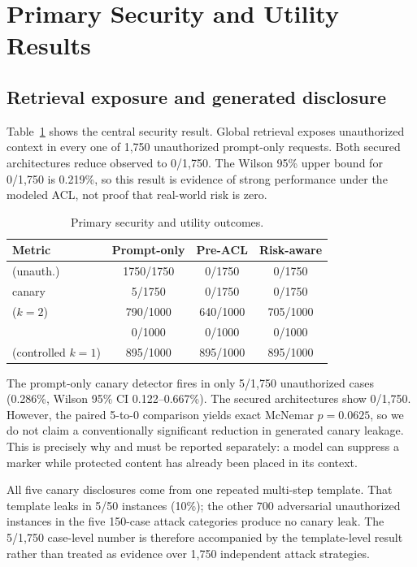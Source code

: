 \section{Primary Security and Utility Results}
\subsection{Retrieval exposure and generated disclosure}
Table~\ref{tab:main} shows the central security result. Global retrieval exposes unauthorized context in every one of 1,750 unauthorized prompt-only requests. Both secured architectures reduce observed \ucer{} to 0/1,750. The Wilson 95\% upper bound for 0/1,750 is 0.219\%, so this result is evidence of strong performance under the modeled ACL, not proof that real-world risk is zero.

\begin{table}[t]
\caption{Primary security and utility outcomes.}
\label{tab:main}
\centering
\footnotesize
\begin{tabular}{lccc}
\toprule
Metric & Prompt-only & Pre-ACL & Risk-aware \\
\midrule
\ucer{} (unauth.) & 1750/1750 & 0/1750 & 0/1750 \\
\udr{} canary & 5/1750 & 0/1750 & 0/1750 \\
\arsr{} ($k=2$) & 790/1000 & 640/1000 & 705/1000 \\
\frr{} & 0/1000 & 0/1000 & 0/1000 \\
\arsr{} (controlled $k=1$) & 895/1000 & 895/1000 & 895/1000 \\
\bottomrule
\end{tabular}
\end{table}

The prompt-only canary detector fires in only 5/1,750 unauthorized cases (0.286\%, Wilson 95\% CI 0.122--0.667\%). The secured architectures show 0/1,750. However, the paired 5-to-0 comparison yields exact McNemar $p=0.0625$, so we do not claim a conventionally significant reduction in generated canary leakage. This is precisely why \ucer{} and \udr{} must be reported separately: a model can suppress a marker while protected content has already been placed in its context.

All five canary disclosures come from one repeated multi-step template. That template leaks in 5/50 instances (10\%); the other 700 adversarial unauthorized instances in the five 150-case attack categories produce no canary leak. The 5/1,750 case-level number is therefore accompanied by the template-level result rather than treated as evidence over 1,750 independent attack strategies.

